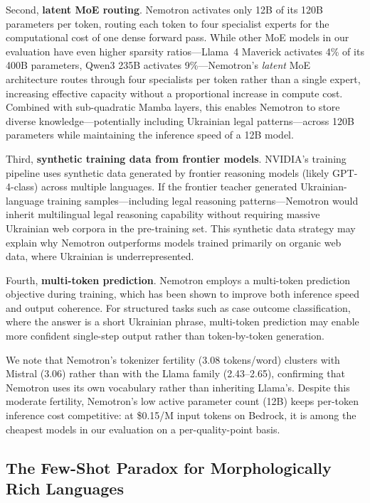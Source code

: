 \documentclass[11pt,a4paper]{article}
\begin{document}
Second, \textbf{latent MoE routing}. Nemotron activates only 12B of its 120B parameters per token, routing each token to four specialist experts for the computational cost of one dense forward pass. While other MoE models in our evaluation have even higher sparsity ratios---Llama~4 Maverick activates 4\% of its 400B parameters, Qwen3 235B activates 9\%---Nemotron's \emph{latent} MoE architecture routes through four specialists per token rather than a single expert, increasing effective capacity without a proportional increase in compute cost. Combined with sub-quadratic Mamba layers, this enables Nemotron to store diverse knowledge---potentially including Ukrainian legal patterns---across 120B parameters while maintaining the inference speed of a 12B model.

Third, \textbf{synthetic training data from frontier models}. NVIDIA's training pipeline uses synthetic data generated by frontier reasoning models (likely GPT-4-class) across multiple languages. If the frontier teacher generated Ukrainian-language training samples---including legal reasoning patterns---Nemotron would inherit multilingual legal reasoning capability without requiring massive Ukrainian web corpora in the pre-training set. This synthetic data strategy may explain why Nemotron outperforms models trained primarily on organic web data, where Ukrainian is underrepresented.

Fourth, \textbf{multi-token prediction}. Nemotron employs a multi-token prediction objective during training, which has been shown to improve both inference speed and output coherence. For structured tasks such as case outcome classification, where the answer is a short Ukrainian phrase, multi-token prediction may enable more confident single-step output rather than token-by-token generation.

We note that Nemotron's tokenizer fertility (3.08 tokens/word) clusters with Mistral (3.06) rather than with the Llama family (2.43--2.65), confirming that Nemotron uses its own vocabulary rather than inheriting Llama's. Despite this moderate fertility, Nemotron's low active parameter count (12B) keeps per-token inference cost competitive: at \$0.15/M input tokens on Bedrock, it is among the cheapest models in our evaluation on a per-quality-point basis.

\subsection{The Few-Shot Paradox for Morphologically Rich Languages}
\end{document}
